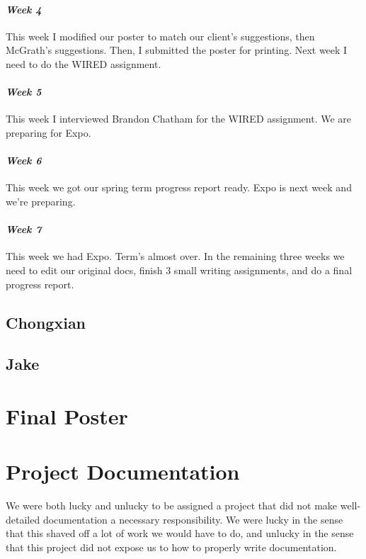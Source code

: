\documentclass[onecolumn, draftclsnofoot,10pt, compsoc]{IEEEtran}
\begin{document}
\paragraph{\emph{Week 4}}
This week I modified our poster to match our client's suggestions, then McGrath's suggestions. Then, I submitted the poster for printing. Next week I need to do the WIRED assignment.
\paragraph{\emph{Week 5}}
This week I interviewed Brandon Chatham for the WIRED assignment. We are preparing for Expo.
\paragraph{\emph{Week 6}}
This week we got our spring term progress report ready. Expo is next week and we're preparing.
\paragraph{\emph{Week 7}}
This week we had Expo. Term's almost over. In the remaining three weeks we need to edit our original docs, finish 3 small writing assignments, and do a final progress report.
\subsection{Chongxian}

\subsection{Jake}

\newpage
\section{Final Poster}

\newpage

\section{Project Documentation}
We were both lucky and unlucky to be assigned a project that did not make well-detailed documentation a necessary responsibility. We were lucky in the sense that this shaved off a lot of work we would have to do, and unlucky in the sense that this project did not expose us to how to properly write documentation.
\end{document}
